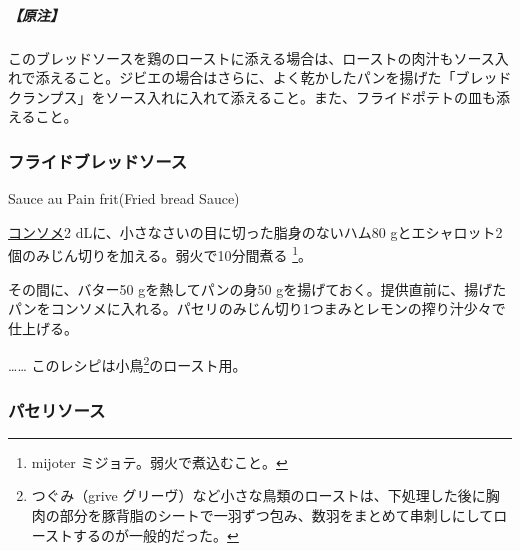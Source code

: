 \begin{recette}
\hypertarget{nota-bread-sauce}{%
\subparagraph{【原注】}\label{nota-bread-sauce}}

このブレッドソースを鶏のローストに添える場合は、ローストの肉汁もソース入れで添えること。ジビエの場合はさらに、よく乾かしたパンを揚げた「ブレッドクランプス」をソース入れに入れて添えること。また、フライドポテトの皿も添えること。

\atoaki{}

\hypertarget{fried-bread-sauce}{%
\subsubsection{フライドブレッドソース}\label{fried-bread-sauce}}

\begin{frsubenv}

Sauce au Pain frit\hspace{1em}\normalfont(Fried bread Sauce)

\end{frsubenv}


\protect\hyperlink{consomme-blanc-simple}{コンソメ}2
dLに、小さなさいの目に切った脂身のないハム80
gとエシャロット2個のみじん切りを加える。弱火で10分間煮る \footnote{mijoter
  ミジョテ。弱火で煮込むこと。}。

その間に、バター50 gを熱してパンの身50
gを揚げておく。提供直前に、揚げたパンをコンソメに入れる。パセリのみじん切り1つまみとレモンの搾り汁少々で仕上げる。

\ldots{}\ldots{} このレシピは小鳥\footnote{つぐみ（grive
  グリーヴ）など小さな鳥類のローストは、下処理した後に胸肉の部分を豚背脂のシートで一羽ずつ包み、数羽をまとめて串刺しにしてローストするのが一般的だった。}のロースト用。

\atoaki{}

\hypertarget{perseley-sauce}{%
\subsubsection{パセリソース}\label{perseley-sauce}}


\end{recette}
